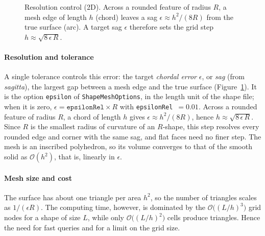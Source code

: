 \documentclass[11pt,a4paper]{article}
\newcommand{\Rmink}{R}                 %
\newcommand{\sag}{\epsilon}
\newcommand{\code}[1]{\texttt{#1}}
\begin{document}
\begin{figure}[tb]
  \centering
  \begin{minipage}{0.42\linewidth}
  \centering
  \end{minipage}\hfill
  \begin{minipage}{0.55\linewidth}
  \caption{Resolution control (2D). Across a rounded feature of radius $\Rmink$, a
  mesh edge of length $h$ (chord) leaves a sag $\sag\approx h^2/(8\Rmink)$ from the
  true surface (arc). A target sag $\sag$ therefore sets the grid step
  $h\approx\sqrt{8\,\sag\,\Rmink}$.}
  \label{fig:sag}
  \end{minipage}
\end{figure}

\paragraph{Resolution and tolerance} A single tolerance controls this error: the
target \emph{chordal error} $\sag$, or \emph{sag} (from \emph{sagitta}), the
largest gap between a mesh edge and the true surface (Figure~\ref{fig:sag}). It is
the option \code{epsilon} of \code{ShapeMeshOptions}, in the length unit of the
shape file; when it is zero, $\sag = \code{epsilonRel}\times\Rmink$ with
\code{epsilonRel}~$=0.01$. Across a rounded feature of radius $\Rmink$, a chord of
length $h$ gives $\sag\approx h^2/(8\Rmink)$, hence $h\approx\sqrt{8\,\sag\,\Rmink}$.
Since $\Rmink$ is the smallest radius of curvature of an $R$-shape, this step
resolves every rounded edge and corner with the same sag, and flat faces need no
finer step. The mesh is an inscribed polyhedron, so its volume converges to that
of the smooth solid as $\mathcal{O}(h^2)$, that is, linearly in $\sag$.

\paragraph{Mesh size and cost} The surface has about one triangle per area $h^2$,
so the number of triangles scales as $1/(\sag\Rmink)$. The computing time,
however, is dominated by the $\mathcal{O}\big((L/h)^3\big)$ grid nodes for a shape
of size $L$, while only $\mathcal{O}\big((L/h)^2\big)$ cells produce triangles.
Hence the need for fast queries and for a limit on the grid size.
\end{document}
